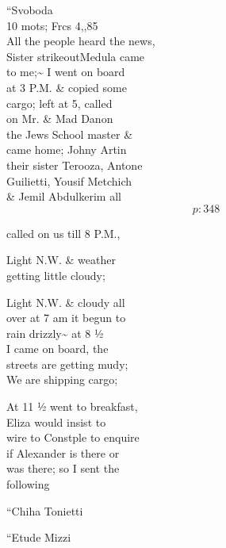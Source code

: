 \documentclass{report}
\begin{document}
	\par{
 	“Svoboda\ \\10 mots; Frcs 4,,85\ \\All the people heard the news,\ \\Sister \lbrack strikeout\rbrack Medula came\ \\to me;\~{} I went on board\ \\at 3 P.M. \& copied some\ \\cargo; left at 5, called\ \\on Mr. \& Mad Danon\ \\the Jews School master \&\ \\came home; Johny Artin\ \\their sister Terooza, Antone\ \\Guilietti, Yousif Metchich\ \\\& Jemil Abdulkerim all\ \\
  \[p: 348 \]

	}

	\par{
 	called on us till 8 P.M.,\ \\
	}

	\par{
 	Light N.W. \& weather\ \\getting little cloudy;\ \\
	}

	\par{
 	Light N.W. \& cloudy all\ \\over at 7 am it begun to\ \\rain drizzly\~{} at 8 ½\ \\I came on board, the\ \\streets are getting mudy;\ \\We are shipping cargo;\ \\
	}

	\par{
 	At 11 ½ went to breakfast,\ \\Eliza would insist to\ \\wire to Constple to enquire\ \\if Alexander is there or\ \\was there; so I sent the\ \\following\ \\
	}

	\par{
 	“Chiha Tonietti\ \\
	}

	\par{
 	“Etude Mizzi\ \\
	}
\end{document}
